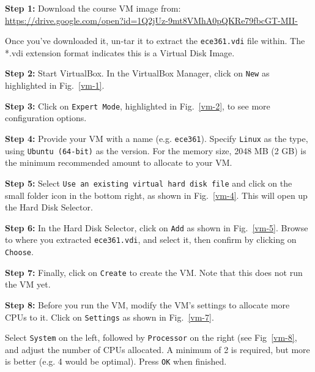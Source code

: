 \documentclass[11pt]{article}
\begin{document}
\textbf{Step 1:} Download the course VM image from:\\
\url{https://drive.google.com/open?id=1Q2jUz-9mt8VMhA0pQKRe79fbcGT-MII-}

\noindent Once you've downloaded it, un-tar it to extract the \texttt{ece361.vdi} file within. The *.vdi extension format indicates this is a Virtual Disk Image.

\textbf{Step 2:} Start VirtualBox. In the VirtualBox Manager, click on \texttt{New} as highlighted in Fig.~\ref{vm-1}.

\textbf{Step 3:} Click on \texttt{Expert Mode}, highlighted in Fig.~\ref{vm-2}, to see more configuration options.

\textbf{Step 4:} Provide your VM with a name (e.g. \texttt{ece361}). Specify \texttt{Linux} as the type, using \texttt{Ubuntu (64-bit)} as the version. For the memory size, 2048 MB (2 GB) is the minimum recommended amount to allocate to your VM.

\textbf{Step 5:} Select \texttt{Use an existing virtual hard disk file} and click on the small folder icon in the bottom right, as shown in Fig.~\ref{vm-4}. This will open up the Hard Disk Selector.

\textbf{Step 6:} In the Hard Disk Selector, click on \texttt{Add} as shown in Fig.~\ref{vm-5}. Browse to where you extracted \texttt{ece361.vdi}, and select it, then confirm by clicking on \texttt{Choose}.

\textbf{Step 7:} Finally, click on \texttt{Create} to create the VM. Note that this does not run the VM yet.

\textbf{Step 8:} Before you run the VM, modify the VM's settings to allocate more CPUs to it. Click on \texttt{Settings} as shown in Fig.~\ref{vm-7}.

Select \texttt{System} on the left, followed by \texttt{Processor} on the right (see Fig~\ref{vm-8}, and adjust the number of CPUs allocated. A minimum of 2 is required, but more is better (e.g. 4 would be optimal). Press \texttt{OK} when finished.
\end{document}
